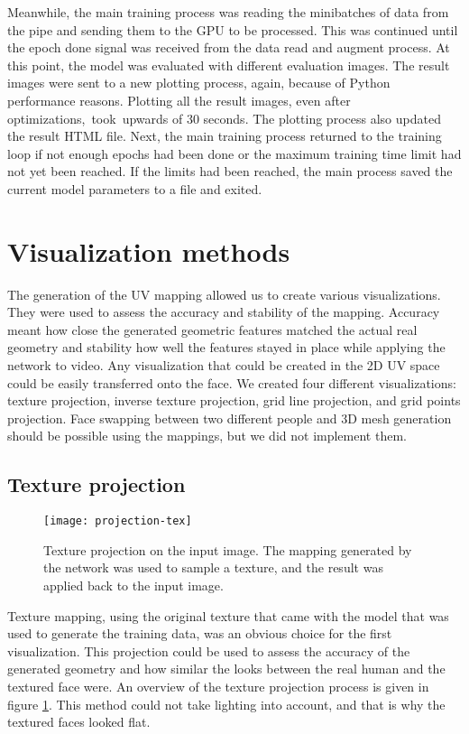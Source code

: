 Meanwhile, the main training process was reading the minibatches of data from the pipe and sending them to the \ac{GPU} to be processed. This was continued until the epoch done signal was received from the data read and augment process. At this point, the model was evaluated with different evaluation images. The result images were sent to a new plotting process, again, because of Python performance reasons. Plotting all the result images, even after optimizations, took upwards of 30 seconds. The plotting process also updated the result \ac{HTML} file. Next, the main training process returned to the training loop if not enough epochs had been done or the maximum training time limit had not yet been reached. If the limits had been reached, the main process saved the current model parameters to a file and exited.

\section{Visualization methods}
\label{sec:viz_methods}

The generation of the UV mapping allowed us to create various visualizations. They were used to assess the accuracy and stability of the mapping. Accuracy meant how close the generated geometric features matched the actual real geometry and stability how well the features stayed in place while applying the network to video. Any visualization that could be created in the 2D UV space could be easily transferred onto the face. We created four different visualizations: texture projection, inverse texture projection, grid line projection, and grid points projection. Face swapping between two different people and 3D mesh generation should be possible using the mappings, but we did not implement them.

\subsection{Texture projection}

\begin{figure}
    \texttt{[image: projection-tex]}
    \caption[Texture projection]{Texture projection on the input image. The mapping generated by the network was used to sample a texture, and the result was applied back to the input image.}
    \label{fig:projection_tex_1}
\end{figure}

Texture mapping, using the original texture that came with the model that was used to generate the training data, was an obvious choice for the first visualization. This projection could be used to assess the accuracy of the generated geometry and how similar the looks between the real human and the textured face were. An overview of the texture projection process is given in figure \ref{fig:projection_tex_1}. This method could not take lighting into account, and that is why the textured faces looked flat.

